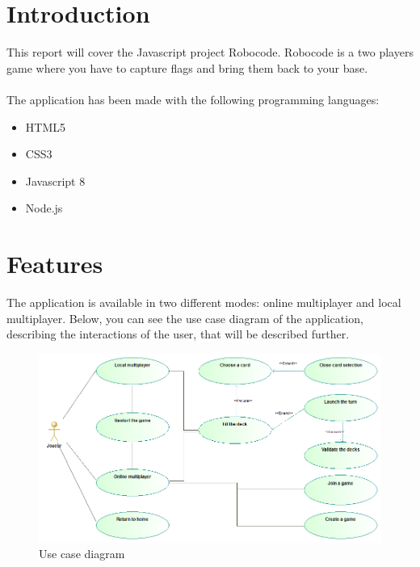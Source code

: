\documentclass[a4paper, 10pt, oneside]{article}
\begin{document}
\newpage
\tableofcontents

\newpage
\listoffigures

\newpage
\section{Introduction}
	This report will cover the Javascript project Robocode. Robocode is a two players game where you have to capture flags and bring them back to your base.\\\\
	The application has been made with the following programming languages:
	\begin{itemize}
		\item HTML5
		\item CSS3
		\item Javascript 8
		\item Node.js
	\end{itemize}

\newpage
\section{Features}
	The application is available in two different modes: online multiplayer and local multiplayer. Below, you can see the use case diagram of the application, describing the interactions of the user, that will be described further.
	
	\begin{figure}[h]
		\centering
		\includegraphics[scale=0.35]{img/use_case.png}
		\caption{Use case diagram}
		\label{fig:UseCase}
	\end{figure}
	
\end{document}
